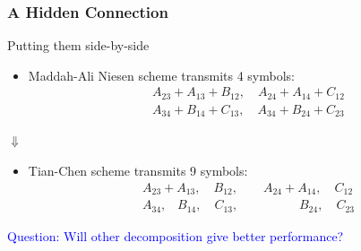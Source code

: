 \documentclass{beamer}
\begin{document}


\begin{frame}
\frametitle{A Hidden Connection}
Putting them side-by-side
\begin{itemize}
\item Maddah-Ali Niesen scheme transmits 4 symbols:
\begin{align*}
& A_{23} +A_{13}+B_{12}, \quad  A_{24} +A_{14}+C_{12} \\
& A_{34} +B_{14}+C_{13} ,\quad  A_{34} +B_{24}+C_{23}
\end{align*}
\end{itemize}
\centering
$\Downarrow$
\begin{itemize}
\item Tian-Chen scheme transmits 9 symbols:
\begin{align*}
& A_{23} +A_{13}, \quad B_{12}, \qquad  A_{24} +A_{14}, \quad C_{12} \\
& A_{34}, \;\;\; B_{14}, \quad C_{13}, \qquad  \qquad \;\;\; B_{24}, \quad C_{23}
\end{align*}
\end{itemize}
\pause
\vspace{0.4cm}
\centering
\textcolor{blue}{Question: Will other decomposition give better performance?}
\end{frame}
\end{document}
